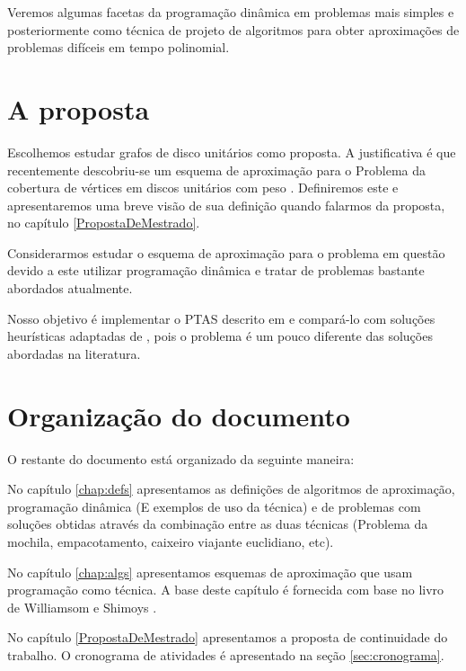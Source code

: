 Veremos algumas facetas da programação dinâmica em problemas mais simples e posteriormente como técnica de projeto de algoritmos para obter aproximações de problemas difíceis em tempo polinomial.

\section{A proposta}

Escolhemos estudar grafos de disco unitários como proposta. A justificativa é que recentemente descobriu-se um esquema de aproximação para o Problema da cobertura de vértices em discos unitários com peso \cite{li}. Definiremos este e apresentaremos uma breve visão de sua definição quando falarmos da proposta, no capítulo \ref{PropostaDeMestrado}.

Considerarmos estudar o esquema de aproximação para o problema em questão devido a este utilizar programação dinâmica e tratar de problemas bastante abordados atualmente.

Nosso objetivo é implementar o PTAS descrito em \cite{li} e compará-lo com soluções heurísticas adaptadas de \cite{marathe1995simple}, pois o problema é um pouco diferente das soluções abordadas na literatura.

\section{Organização do documento}

O restante do documento está organizado da seguinte maneira:

No capítulo \ref{chap:defs} apresentamos as definições de algoritmos de aproximação, programação dinâmica (E exemplos de uso da técnica) e de problemas com soluções obtidas através da combinação entre as duas técnicas (Problema da mochila, empacotamento, caixeiro viajante euclidiano, etc).

No capítulo \ref{chap:algs} apresentamos esquemas de aproximação que usam programação como técnica. A base deste capítulo é fornecida com base no livro de Williamsom e Shimoys \cite{Williamson}.

No capítulo \ref{PropostaDeMestrado} apresentamos a proposta de continuidade do trabalho. O cronograma de atividades é apresentado na seção \ref{sec:cronograma}.